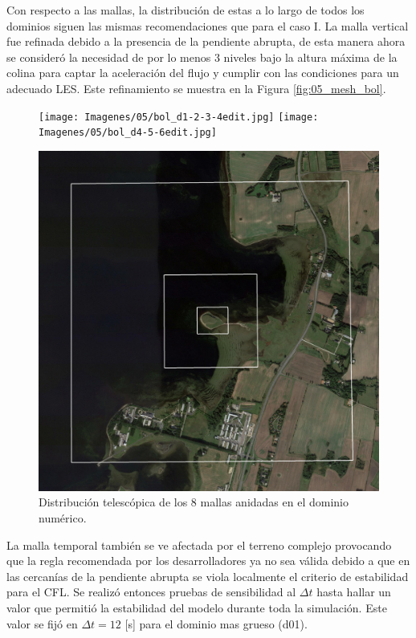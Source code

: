 Con respecto a las mallas, la distribución de estas a lo largo de todos los dominios siguen las mismas recomendaciones que para el caso I. La malla vertical fue refinada debido a la presencia de la pendiente abrupta, de esta manera ahora se consideró la necesidad de por lo menos 3 niveles bajo la altura máxima de la colina para captar la aceleración del flujo y cumplir con las condiciones para un adecuado LES. Este refinamiento se muestra en la Figura \ref{fig:05_mesh_bol}.

\begin{figure}[H]
	\centering
	\texttt{[image: Imagenes/05/bol\_d1-2-3-4edit.jpg]}
	\texttt{[image: Imagenes/05/bol\_d4-5-6edit.jpg]}
	
	\bigskip
	\includegraphics[width=0.55\linewidth,page=1,trim={5mm 3mm 3mm 3mm},clip,frame]{Imagenes/05/bol_d6-7-8edit.jpg}%
	
	\caption{Distribución telescópica de los 8 mallas anidadas en el dominio numérico.}
	\label{fig:05_dom_bol}
\end{figure}

La malla temporal también se ve afectada por el terreno complejo provocando que la regla recomendada por los desarrolladores ya no sea válida debido a que en las cercanías de la pendiente abrupta se viola localmente el criterio de estabilidad para el CFL. Se realizó entonces pruebas de sensibilidad al $\Delta t$ hasta hallar un valor que permitió la estabilidad del modelo durante toda la simulación. Este valor se fijó en $\Delta t = 12$ [s] para el dominio mas grueso (d01).

